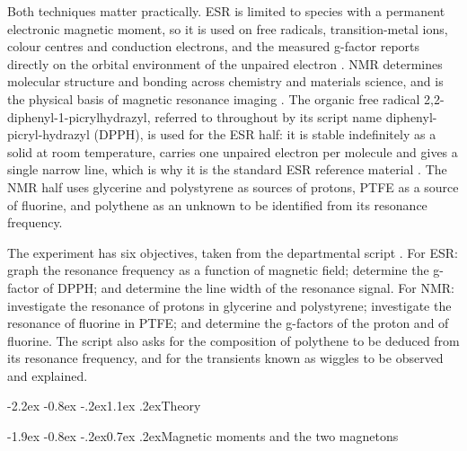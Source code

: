 \documentclass[11pt,a4paper]{article}
\makeatletter
\renewcommand\section{\@startsection{section}{1}{\z@}%
  {-2.2ex \@plus -0.8ex \@minus -.2ex}{1.1ex \@plus .2ex}{\normalfont\large\bfseries}}
\renewcommand\subsection{\@startsection{subsection}{2}{\z@}%
  {-1.9ex \@plus -0.8ex \@minus -.2ex}{0.7ex \@plus .2ex}{\normalfont\normalsize\bfseries}}
\makeatother
\begin{document}
Both techniques matter practically. ESR is limited to species with a permanent electronic
magnetic moment, so it is used on free radicals, transition-metal ions, colour centres and
conduction electrons, and the measured g-factor reports directly on the orbital environment of
the unpaired electron \cite{weilbolton}. NMR determines molecular structure and bonding across
chemistry and materials science, and is the physical basis of magnetic resonance imaging
\cite{abragam,slichter}. The organic free radical 2,2-diphenyl-1-picrylhydrazyl, referred to
throughout by its script name diphenyl-picryl-hydrazyl (DPPH), is used for the ESR half: it is
stable indefinitely as a solid at room temperature, carries one unpaired electron per molecule
and gives a single narrow line, which is why it is the standard ESR reference material
\cite{krzystek}. The NMR half uses glycerine and polystyrene as sources of protons, PTFE as a
source of fluorine, and polythene as an unknown to be identified from its resonance frequency.

The experiment has six objectives, taken from the departmental script \cite{script}. For ESR:
graph the resonance frequency as a function of magnetic field; determine the g-factor of DPPH;
and determine the line width of the resonance signal. For NMR: investigate the resonance of
protons in glycerine and polystyrene; investigate the resonance of fluorine in PTFE; and determine
the g-factors of the proton and of fluorine. The script also asks for the composition of polythene
to be deduced from its resonance frequency, and for the transients known as wiggles to be observed
and explained.

\section{Theory}

\subsection{Magnetic moments and the two magnetons}
\end{document}
